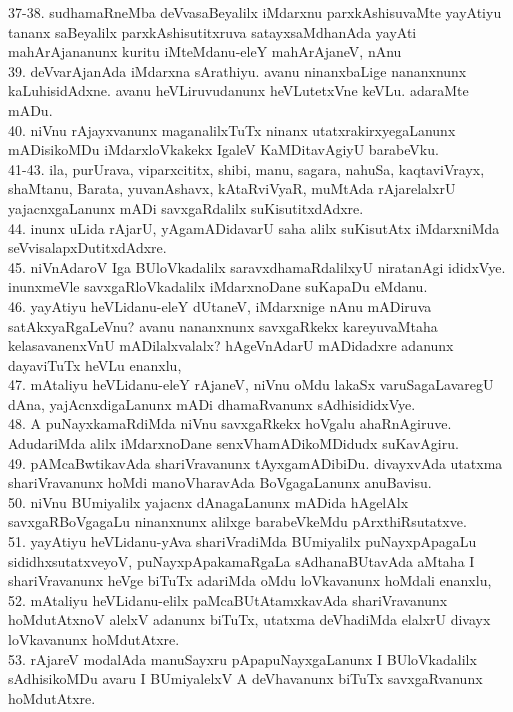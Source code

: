 \documentclass{article}
\begin{document}
37-38. sudhamaRneMba deVvasaBeyalilx iMdarxnu parxkAshisuvaMte yayAtiyu tananx saBeyalilx parxkAshisutitxruva satayxsaMdhanAda yayAti mahArAjananunx kuritu iMteMdanu-eleY mahArAjaneV, nAnu\\
39. deVvarAjanAda iMdarxna sArathiyu. avanu ninanxbaLige nananxnunx kaLuhisidAdxne. avanu heVLiruvudanunx heVLutetxVne keVLu. adaraMte mADu.\\
40. niVnu rAjayxvanunx maganalilxTuTx ninanx utatxrakirxyegaLanunx mADisikoMDu iMdarxloVkakekx IgaleV KaMDitavAgiyU barabeVku.\\
41-43. ila, purUrava, viparxcititx, shibi, manu, sagara, nahuSa, kaqtaviVrayx, shaMtanu, Barata, yuvanAshavx, kAtaRviVyaR, muMtAda rAjarelalxrU yajacnxgaLanunx mADi savxgaRdalilx suKisutitxdAdxre.\\
44. inunx uLida rAjarU, yAgamADidavarU saha alilx suKisutAtx iMdarxniMda seVvisalapxDutitxdAdxre.\\
45. niVnAdaroV Iga BUloVkadalilx saravxdhamaRdalilxyU niratanAgi ididxVye. inunxmeVle savxgaRloVkadalilx iMdarxnoDane suKapaDu eMdanu.\\
46. yayAtiyu heVLidanu-eleY dUtaneV, iMdarxnige nAnu mADiruva satAkxyaRgaLeVnu? avanu nananxnunx savxgaRkekx kareyuvaMtaha kelasavanenxVnU mADilalxvalalx? hAgeVnAdarU mADidadxre adanunx dayaviTuTx heVLu enanxlu,\\
47. mAtaliyu heVLidanu-eleY rAjaneV, niVnu oMdu lakaSx varuSagaLavaregU dAna, yajAcnxdigaLanunx mADi dhamaRvanunx sAdhisididxVye.\\
48. A puNayxkamaRdiMda niVnu savxgaRkekx hoVgalu ahaRnAgiruve. AdudariMda alilx iMdarxnoDane senxVhamADikoMDidudx suKavAgiru.\\
49. pAMcaBwtikavAda shariVravanunx tAyxgamADibiDu. divayxvAda utatxma shariVravanunx hoMdi manoVharavAda BoVgagaLanunx anuBavisu.\\
50. niVnu BUmiyalilx yajacnx dAnagaLanunx mADida hAgelAlx savxgaRBoVgagaLu ninanxnunx alilxge barabeVkeMdu pArxthiRsutatxve.\\
51. yayAtiyu heVLidanu-yAva shariVradiMda BUmiyalilx puNayxpApagaLu sididhxsutatxveyoV, puNayxpApakamaRgaLa sAdhanaBUtavAda aMtaha I shariVravanunx heVge biTuTx adariMda oMdu loVkavanunx hoMdali enanxlu,\\
52. mAtaliyu heVLidanu-elilx paMcaBUtAtamxkavAda shariVravanunx hoMdutAtxnoV alelxV adanunx biTuTx, utatxma deVhadiMda elalxrU divayx loVkavanunx hoMdutAtxre.\\
53. rAjareV modalAda manuSayxru pApapuNayxgaLanunx I BUloVkadalilx sAdhisikoMDu avaru I BUmiyalelxV A deVhavanunx biTuTx savxgaRvanunx hoMdutAtxre.\\
\end{document}
